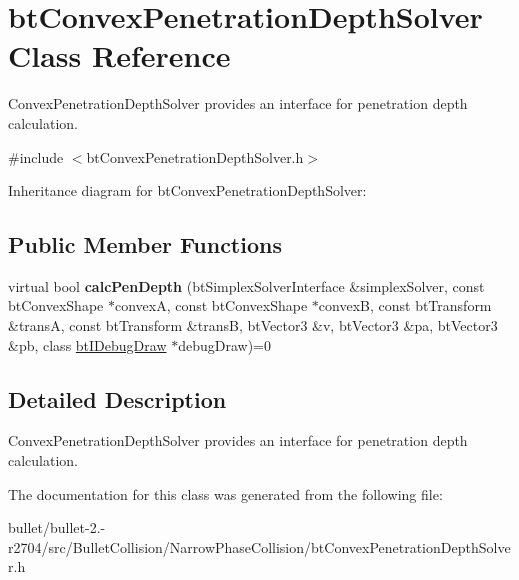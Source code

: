 \hypertarget{classbt_convex_penetration_depth_solver}{\section{bt\+Convex\+Penetration\+Depth\+Solver Class Reference}
\label{classbt_convex_penetration_depth_solver}
}


Convex\+Penetration\+Depth\+Solver provides an interface for penetration depth calculation.  




{\ttfamily \#include $<$bt\+Convex\+Penetration\+Depth\+Solver.\+h$>$}



Inheritance diagram for bt\+Convex\+Penetration\+Depth\+Solver\+:
\subsection*{Public Member Functions}
\begin{DoxyCompactItemize}
\item 
\hypertarget{classbt_convex_penetration_depth_solver_a6330f083a2847efc4444e94160f0c622}{virtual bool {\bfseries calc\+Pen\+Depth} (bt\+Simplex\+Solver\+Interface \&simplex\+Solver, const bt\+Convex\+Shape $\ast$convex\+A, const bt\+Convex\+Shape $\ast$convex\+B, const bt\+Transform \&trans\+A, const bt\+Transform \&trans\+B, bt\+Vector3 \&v, bt\+Vector3 \&pa, bt\+Vector3 \&pb, class \hyperlink{classbt_i_debug_draw}{bt\+I\+Debug\+Draw} $\ast$debug\+Draw)=0}\label{classbt_convex_penetration_depth_solver_a6330f083a2847efc4444e94160f0c622}

\end{DoxyCompactItemize}


\subsection{Detailed Description}
Convex\+Penetration\+Depth\+Solver provides an interface for penetration depth calculation. 

The documentation for this class was generated from the following file\+:\begin{DoxyCompactItemize}
\item 
bullet/bullet-\/2.-\/r2704/src/\+Bullet\+Collision/\+Narrow\+Phase\+Collision/bt\+Convex\+Penetration\+Depth\+Solver.\+h\end{DoxyCompactItemize}
